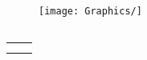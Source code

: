 
\begin{figure}[h]
	\centering
	\texttt{[image: Graphics/]}
	\caption{}
	\label{fig:}
\end{figure}


\begin{equation} \label{eq:}
	
\end{equation}


\smallskip 
\begin{center}
	\begin{tabular}{l p{12cm}}
		$  $ & \\
		$  $ & 
	\end{tabular}
\end{center} \smallskip